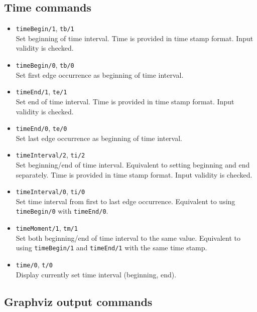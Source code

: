 \documentclass[11pt, a4paper,draft]{article}
\newcommand{\pl}[1]{\texttt{#1}} %
\theoremstyle{plain}
\theoremstyle{definition}
\theoremstyle{remark}
\begin{document}
\subsection{Time commands}

\begin{itemize}
\item \pl{timeBegin/1}, \pl{tb/1} \\
Set beginning of time interval. 
Time is provided in time stamp format. 
Input validity is checked.

\item \pl{timeBegin/0}, \pl{tb/0} \\
Set first edge occurrence as beginning of time interval.

\item \pl{timeEnd/1}, \pl{te/1} \\
Set end of time interval. 
Time is provided in time stamp format. 
Input validity is checked.

\item \pl{timeEnd/0}, \pl{te/0} \\
Set last edge occurrence as beginning of time interval.

\item \pl{timeInterval/2}, \pl{ti/2} \\
Set beginning/end of time interval. 
Equivalent to setting beginning and end separately. 
Time is provided in time stamp format. 
Input validity is checked.

\item \pl{timeInterval/0}, \pl{ti/0} \\
Set time interval from first to last edge occurrence. 
Equivalent to using \pl{timeBegin/0} with \pl{timeEnd/0}.

\item \pl{timeMoment/1}, \pl{tm/1} \\
Set both beginning/end of time interval to the same value. 
Equivalent to using \pl{timeBegin/1} and \pl{timeEnd/1} with the same time stamp.

\item \pl{time/0}, \pl{t/0} \\
Display currently set time interval (beginning, end).
\end{itemize}

\subsection{Graphviz output commands}
\end{document}
